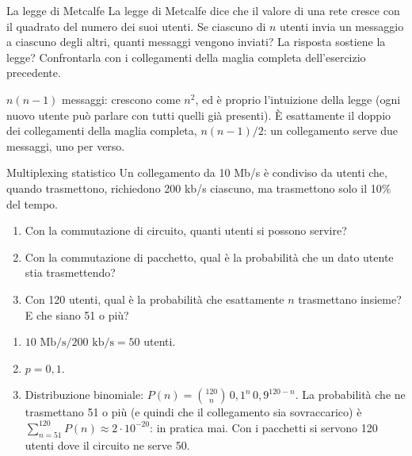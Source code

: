\begin{esercizio}{La legge di Metcalfe}
La legge di Metcalfe dice che il valore di una rete cresce con il quadrato del numero dei suoi utenti. Se ciascuno di $n$ utenti invia un
messaggio a ciascuno degli altri, quanti messaggi vengono inviati? La risposta sostiene la legge? Confrontarla con i collegamenti della
maglia completa dell'esercizio precedente.

\svolgimento
$n(n-1)$ messaggi: crescono come $n^2$, ed è proprio l'intuizione della legge (ogni nuovo utente può parlare con tutti quelli già
presenti). È esattamente il doppio dei collegamenti della maglia completa, $n(n-1)/2$: un collegamento serve due messaggi, uno per verso.
\end{esercizio}

\begin{esercizio}{Multiplexing statistico}
Un collegamento da 10 Mb/s è condiviso da utenti che, quando trasmettono, richiedono 200 kb/s ciascuno, ma trasmettono solo il 10\% del
tempo.
\begin{enumerate}[label=(\alph*)]
    \item Con la commutazione di circuito, quanti utenti si possono servire?
    \item Con la commutazione di pacchetto, qual è la probabilità che un dato utente stia trasmettendo?
    \item Con 120 utenti, qual è la probabilità che esattamente $n$ trasmettano insieme? E che siano 51 o più?
\end{enumerate}

\svolgimento
\begin{enumerate}[label=(\alph*)]
    \item $10 \text{ Mb/s} / 200 \text{ kb/s} = 50$ utenti.
    \item $p = 0{,}1$.
    \item Distribuzione binomiale: $P(n) = \binom{120}{n}\, 0{,}1^n\, 0{,}9^{120-n}$. La probabilità che ne trasmettano 51 o più (e quindi che
          il collegamento sia sovraccarico) è $\sum_{n=51}^{120} P(n) \approx 2 \cdot 10^{-20}$: in pratica mai. Con i pacchetti si servono
          120 utenti dove il circuito ne serve 50.
\end{enumerate}
\end{esercizio}

